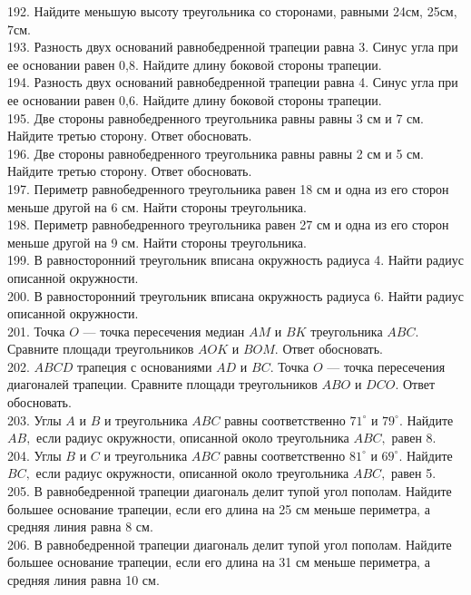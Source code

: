 192. Найдите меньшую высоту треугольника со сторонами, равными 24см, 25см, 7см.\\
193. Разность двух оснований равнобедренной трапеции равна 3. Синус угла при ее основании равен 0,8. Найдите длину боковой стороны трапеции.\\
194. Разность двух оснований равнобедренной трапеции равна 4. Синус угла при ее основании равен 0,6. Найдите длину боковой стороны трапеции.\\
195. Две стороны равнобедренного треугольника равны равны 3 см и 7 см. Найдите третью сторону. Ответ обосновать.\\
196. Две стороны равнобедренного треугольника равны равны 2 см и 5 см. Найдите третью сторону. Ответ обосновать.\\
197. Периметр равнобедренного треугольника равен 18 см и одна из его сторон меньше другой на 6 см. Найти стороны треугольника.\\
198. Периметр равнобедренного треугольника равен 27 см и одна из его сторон меньше другой на 9 см. Найти стороны треугольника.\\
199. В равносторонний треугольник вписана окружность радиуса 4. Найти радиус описанной окружности.\\
200. В равносторонний треугольник вписана окружность радиуса 6. Найти радиус описанной окружности.\\
201. Точка $O$ --- точка пересечения медиан $AM$ и $BK$ треугольника $ABC.$ Сравните площади треугольников $AOK$ и $BOM.$ Ответ обосновать.\\
202. $ABCD$ трапеция с основаниями $AD$ и $BC.$ Точка $O$ --- точка пересечения диагоналей трапеции. Сравните площади треугольников $ABO$ и $DCO.$ Ответ обосновать.\\
203. Углы $A$ и $B$ и треугольника $ABC$ равны соответственно $71^\circ$ и $79^\circ.$ Найдите $AB,$ если радиус окружности, описанной около треугольника $ABC,$ равен 8.\\
204. Углы $B$ и $C$ и треугольника $ABC$ равны соответственно $81^\circ$ и $69^\circ.$ Найдите $BC,$ если радиус окружности, описанной около треугольника $ABC,$ равен 5.\\
205. В равнобедренной трапеции диагональ делит тупой угол пополам. Найдите большее основание трапеции, если его длина на 25 см меньше периметра, а средняя линия равна 8 см.\\
206. В равнобедренной трапеции диагональ делит тупой угол пополам. Найдите большее основание трапеции, если его длина на 31 см меньше периметра, а средняя линия равна 10 см.\\
